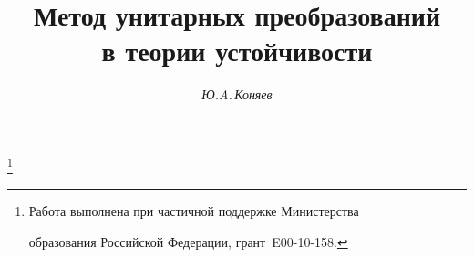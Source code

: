 






\newcommand{\re}{\operatorname{Re}}


\newcommand{\diag}{\operatorname{diag}}







\setcounter{page}{41}















\author{\it Ю.A.\,Коняев}




\title{Метод унитарных преобразований\\ в теории устойчивости}


\thanks{Работа выполнена при частичной поддержке Министерства 


образования Российской Федерации, грант \No\,E00-10-158.}





\date{}




\pagestyle{plain} %







\maketitle



